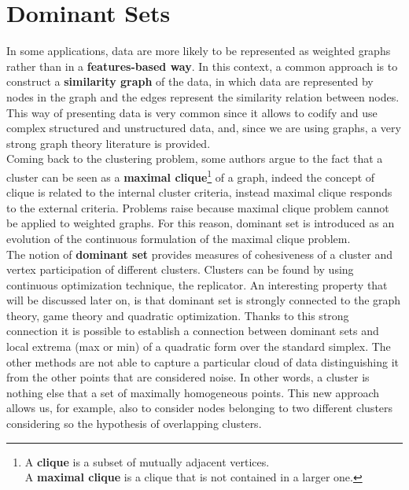 \section{Dominant Sets}
In some applications, data are more likely to be represented as weighted graphs rather than in a \textbf{features-based way}. In this context, a common approach is to construct a \textbf{similarity graph} of the data, in which data are represented by nodes in the graph and the edges represent the similarity relation between nodes. This way of presenting data is very common since it allows to codify and use complex structured and unstructured data, and, since we are using graphs, a very strong graph theory literature is provided.  \\
Coming back to the clustering problem, some authors argue to the fact that a cluster can be seen as a \textbf{maximal clique}\footnote{A \textbf{clique} is a subset of mutually adjacent vertices.\\ A \textbf{maximal clique} is a clique that is not contained in a larger one.} of a graph, indeed the concept of clique is related to the internal cluster criteria, instead maximal clique responds to the external criteria. Problems raise because maximal clique problem cannot be applied to weighted graphs. For this reason, dominant set is introduced as an evolution of the continuous formulation of the maximal clique problem. \\

The notion of \textbf{dominant set} provides measures of cohesiveness of a cluster and vertex participation of different clusters. Clusters can be found by using continuous optimization technique, the replicator. An interesting property that will be discussed later on, is that dominant set is strongly connected to the graph theory, game theory and quadratic optimization. Thanks to this strong connection it is possible to establish a connection between dominant sets and local extrema (max or min) of a quadratic form over the standard simplex. The other methods are not able to capture a particular cloud of data distinguishing it from the other points that are considered noise. In other words, a cluster is nothing else that a set of maximally homogeneous points.
This new approach allows us, for example, also to consider nodes belonging to two different clusters considering so the hypothesis of overlapping clusters.

